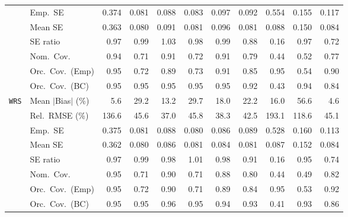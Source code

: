 \begin{landscape}
\begin{longtable}{llrrrrrrrrr}
 & Emp.\ SE & 0.374 & 0.081 & 0.088 & 0.083 & 0.097 & 0.092 & 0.554 & 0.155 & 0.117 \\
 & Mean SE & 0.363 & 0.080 & 0.091 & 0.081 & 0.096 & 0.081 & 0.088 & 0.150 & 0.084 \\
 & SE ratio & \cellcolor{rankthree}0.97 & \cellcolor{rankone}0.99 & \cellcolor{rankthree}1.03 & \cellcolor{ranktwo}0.98 & \cellcolor{rankone}0.99 & 0.88 & 0.16 & \cellcolor{rankthree}0.97 & 0.72 \\
 & Nom.\ Cov. & \cellcolor{rankone}0.94 & 0.71 & \cellcolor{ranktwo}0.91 & 0.72 & \cellcolor{ranktwo}0.91 & \cellcolor{rankthree}0.79 & 0.44 & 0.52 & 0.77 \\
 & Orc.\ Cov.\ (Emp) & \cellcolor{rankone}0.95 & 0.72 & 0.89 & 0.73 & \cellcolor{ranktwo}0.91 & 0.85 & \cellcolor{rankone}0.95 & 0.54 & \cellcolor{rankthree}0.90 \\
 & Orc.\ Cov.\ (BC) & \cellcolor{rankone}0.95 & \cellcolor{rankone}0.95 & \cellcolor{rankone}0.95 & \cellcolor{rankone}0.95 & \cellcolor{rankone}0.95 & \cellcolor{rankthree}0.92 & 0.43 & \cellcolor{ranktwo}0.94 & 0.84 \\
\addlinespace[2pt]
\quad \texttt{WRS} & Mean $|$Bias$|$ (\%) & \cellcolor{ranktwo}5.6 & 29.2 & \cellcolor{rankthree}13.2 & 29.7 & 18.0 & 22.2 & 16.0 & 56.6 & \cellcolor{rankone}4.6 \\
 & Rel.\ RMSE (\%) & 136.6 & 45.6 & \cellcolor{rankone}37.0 & 45.8 & \cellcolor{ranktwo}38.3 & \cellcolor{rankthree}42.5 & 193.1 & 118.6 & 45.1 \\
 & Emp.\ SE & 0.375 & 0.081 & 0.088 & 0.080 & 0.086 & 0.089 & 0.528 & 0.160 & 0.113 \\
 & Mean SE & 0.362 & 0.080 & 0.086 & 0.081 & 0.084 & 0.081 & 0.087 & 0.152 & 0.084 \\
 & SE ratio & \cellcolor{rankthree}0.97 & \cellcolor{rankone}0.99 & \cellcolor{ranktwo}0.98 & \cellcolor{rankone}1.01 & \cellcolor{ranktwo}0.98 & 0.91 & 0.16 & 0.95 & 0.74 \\
 & Nom.\ Cov. & \cellcolor{rankone}0.95 & 0.71 & \cellcolor{ranktwo}0.90 & 0.71 & \cellcolor{rankthree}0.88 & 0.80 & 0.44 & 0.49 & 0.82 \\
 & Orc.\ Cov.\ (Emp) & \cellcolor{rankone}0.95 & 0.72 & \cellcolor{rankthree}0.90 & 0.71 & 0.89 & 0.84 & \cellcolor{rankone}0.95 & 0.53 & \cellcolor{ranktwo}0.92 \\
 & Orc.\ Cov.\ (BC) & \cellcolor{rankone}0.95 & \cellcolor{rankone}0.95 & \cellcolor{ranktwo}0.96 & \cellcolor{rankone}0.95 & \cellcolor{ranktwo}0.94 & \cellcolor{rankthree}0.93 & 0.41 & \cellcolor{rankthree}0.93 & 0.86 \\

\end{longtable}
\end{landscape}
